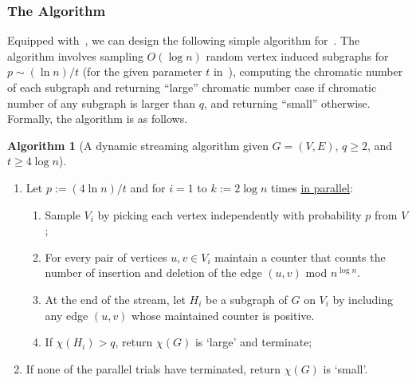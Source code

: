 \documentclass[11pt]{article}
\theoremstyle{definition}
\newenvironment{ourbox}{\begin{mdframed}[hidealllines=false,innerleftmargin=10pt,backgroundcolor=white!10,innertopmargin=5pt,innerbottommargin=5pt,roundcorner=10pt]}{\end{mdframed}}
\newtheorem{mdalgorithm}{Algorithm}
\newenvironment{Algorithm}{\begin{ourbox}\begin{mdalgorithm}}{\end{mdalgorithm}\end{ourbox}}
\renewcommand{\geq}{\geqslant}
\begin{document}
\subsubsection{The Algorithm} 

Equipped with~, we can design the following simple algorithm for~. The algorithm involves sampling $O(\log{n})$ random vertex induced subgraphs for $p \sim (\ln{n})/t$ (for the given
parameter $t$ in~), computing the chromatic number of each subgraph and returning ``large'' chromatic number case if chromatic number of any subgraph is larger than $q$, and returning ``small'' otherwise. 
Formally, the algorithm is as follows. 

\begin{Algorithm}[A dynamic streaming algorithm given $G=(V,E)$, $q \geq 2$, and $t \geq 4\log{n}$]\label{alg:dynamic}
	~\vspace{-4pt}
	\begin{enumerate}
		\item Let $p := (4\ln{n})/t$ and for $i=1$ to $k := 2\log{n}$ times \underline{in parallel}: 
		\begin{enumerate}
			\item Sample $V_i$ by picking each vertex independently with probability $p$ from $V$;
			\item For every pair of vertices $u,v \in V_i$ maintain a counter that counts the number of insertion and deletion of the edge $(u,v)$ mod $n^{\log{n}}$. 
			\item At the end of the stream, let $H_i$ be a subgraph of $G$ on $V_i$ by including any edge $(u,v)$ whose maintained counter is positive. 
			\item If $\chi(H_i) > q$, return $\chi(G)$ is `large' and terminate; 
		\end{enumerate}
		\item If none of the parallel trials have terminated, return $\chi(G)$ is `small'. 
	\end{enumerate}
\end{Algorithm}
\end{document}
